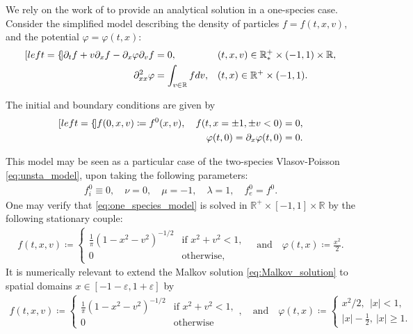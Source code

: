\documentclass{article}
\numberwithin{equation}{section}
\newcommand{\R}{\mathbb{R}}
\newcommand{\mysubeq}[2]{ %
	\begin{subequations}\label{#1}
		\begin{align}[left = {\empheqlbrace}]
			#2
		\end{align}
	\end{subequations}	
}
\begin{document}
We rely on the work of \cite{malkovNonstationaryAntonovSelfgravitating2020} to provide an analytical solution in a one-species case. Consider the simplified 
model describing the density of particles $f = f(t,x,v)$, and the potential $\varphi=\varphi(t,x)$:
\mysubeq{eq:one_species_model}{
	\partial_t f + v \partial_x f  - \partial_x \varphi \partial_v f &= 0, && (t,x,v) \in \R^+_* \times (-1,1) \times \mathbb{R}, \label{sta_1sp_f} \\
	\partial^2_{xx} \varphi &= \int_{v\in\mathbb{R}} f dv, && (t,x) \in \R^+ \times (-1,1). \label{sta_phi}
}
The initial and boundary conditions are given by 
\mysubeq{eq:one_species_model_bc}{
	f(0,x,v) \coloneqq f^0(x,v), \quad f(t,x=\pm1, \pm v < 0) &= 0,  \\
	\varphi(t,0) = \partial_x \varphi (t,0) &= 0.  
}
This model may be seen as a particular case of the two-species Vlasov-Poisson \cref{eq:unsta_model}, upon taking the following parameters:
\begin{align*}
	f_i^0 \equiv 0, \quad \nu = 0, \quad \mu = -1, \quad \lambda = 1, \quad f_e^0 = f^0.
\end{align*}
One may verify that \cref{eq:one_species_model} is solved in $\R^+ \times [-1,1] \times \mathbb{R}$ by the following stationary couple:
\begin{align}\label{eq:Malkov_solution}
	f(t,x,v) \coloneqq 
	\begin{cases}
		\frac{1}{\pi} \left(1 - x^2 - v^2\right)^{-1/2} & \text{if } x^2 + v^2 < 1,  \\
		0 & \text{otherwise}, 
	\end{cases} \quad \text{and} \quad
	\varphi(t,x) \coloneqq \frac{x^2}{2}.
\end{align}
It is numerically relevant to extend the Malkov solution \cref{eq:Malkov_solution} to spatial domains $x \in [-1-\varepsilon, 1+\varepsilon]$ by 
\begin{align}\label{eq:Malkov_solution_ext}
	f(t,x,v) \coloneqq 
	\begin{cases}
		\frac{1}{\pi} \left(1 - x^2 - v^2\right)^{-1/2} & \text{if } x^2 + v^2 < 1, \\
		0 & \text{otherwise}
	\end{cases}, \quad \text{and} \quad
	\varphi(t,x) \coloneqq \left\{\begin{array}{c}
	x^2/2,\ \ \left|x\right|<1,\\
	|x|-\frac{1}{2},\ \left|x\right|\ge 1.
	\end{array}\right.%
\end{align}
\end{document}
